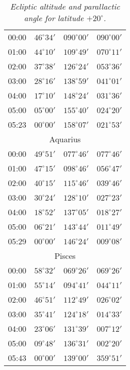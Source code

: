 \begin{table}
\begin{Parallel}{}{}
{{\begin{tabular}{l|lll}
00:00 & $46^\circ 34'$ & $090^\circ 00'$& $090^\circ 00'$ \\
01:00 & $44^\circ 10'$ & $109^\circ 49'$& $070^\circ 11'$ \\
02:00 & $37^\circ 38'$ & $126^\circ 24'$& $053^\circ 36'$ \\
03:00 & $28^\circ 16'$ & $138^\circ 59'$& $041^\circ 01'$ \\
04:00 & $17^\circ 10'$ & $148^\circ 24'$& $031^\circ 36'$ \\
05:00 & $05^\circ 00'$ & $155^\circ 40'$& $024^\circ 20'$ \\
05:23 & $00^\circ 00'$ & $158^\circ 07'$& $021^\circ 53'$ \\
\multicolumn{4}{c}{Aquarius}\\
00:00 & $49^\circ 51'$ & $077^\circ 46'$& $077^\circ 46'$ \\
01:00 & $47^\circ 15'$ & $098^\circ 46'$& $056^\circ 47'$ \\
02:00 & $40^\circ 15'$ & $115^\circ 46'$& $039^\circ 46'$ \\
03:00 & $30^\circ 24'$ & $128^\circ 10'$& $027^\circ 23'$ \\
04:00 & $18^\circ 52'$ & $137^\circ 05'$& $018^\circ 27'$ \\
05:00 & $06^\circ 21'$ & $143^\circ 44'$& $011^\circ 49'$ \\
05:29 & $00^\circ 00'$ & $146^\circ 24'$& $009^\circ 08'$ \\
\multicolumn{4}{c}{Pisces}\\
00:00 & $58^\circ 32'$ & $069^\circ 26'$& $069^\circ 26'$ \\
01:00 & $55^\circ 14'$ & $094^\circ 41'$& $044^\circ 11'$ \\
02:00 & $46^\circ 51'$ & $112^\circ 49'$& $026^\circ 02'$ \\
03:00 & $35^\circ 41'$ & $124^\circ 18'$& $014^\circ 33'$ \\
04:00 & $23^\circ 06'$ & $131^\circ 39'$& $007^\circ 12'$ \\
05:00 & $09^\circ 48'$ & $136^\circ 31'$& $002^\circ 20'$ \\
05:43 & $00^\circ 00'$ & $139^\circ 00'$& $359^\circ 51'$ \\
\end{tabular}
}}
\end{Parallel}
\caption{\em Ecliptic altitude and parallactic angle for latitude $+20^\circ$.}
\end{table}

